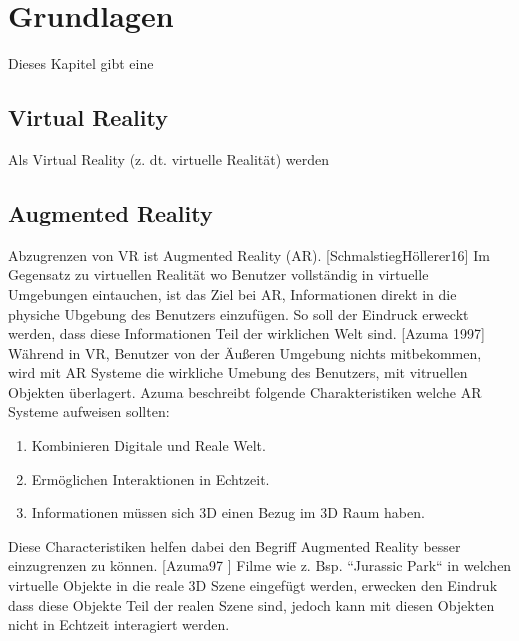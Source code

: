 \chapter{Grundlagen}

Dieses Kapitel gibt eine  

\section{Virtual Reality} 

Als Virtual Reality (z. dt. virtuelle Realität) werden 



\section{Augmented Reality}

Abzugrenzen von VR  ist Augmented Reality (AR). [SchmalstiegHöllerer16] Im Gegensatz zu virtuellen Realität wo Benutzer vollständig in virtuelle Umgebungen eintauchen,
ist das Ziel bei AR, Informationen direkt in die physiche Ubgebung des Benutzers einzufügen. So soll der Eindruck erweckt werden, dass diese Informationen
Teil der wirklichen Welt sind. %
[Azuma 1997] Während in VR, Benutzer von der Äußeren Umgebung nichts mitbekommen, wird mit AR Systeme die wirkliche Umebung des Benutzers, mit vitruellen Objekten überlagert. 
Azuma beschreibt folgende Charakteristiken welche AR Systeme aufweisen sollten: 

\begin{enumerate}
	\item Kombinieren Digitale und Reale Welt.
	\item Ermöglichen Interaktionen in Echtzeit.
	\item Informationen müssen sich 3D einen Bezug im 3D Raum haben.
\end{enumerate}

Diese Characteristiken helfen dabei den Begriff Augmented Reality besser einzugrenzen zu können. [Azuma97 ] Filme wie z. Bsp.  ``Jurassic Park`` in welchen 
virtuelle Objekte in die reale 3D Szene eingefügt werden, erwecken den Eindruk dass diese Objekte Teil der realen Szene sind, jedoch kann mit diesen Objekten nicht in Echtzeit interagiert werden.

